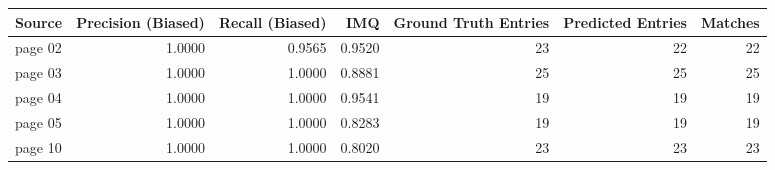 \begin{tabular}{lrrrrrr}
\toprule
Source & Precision (Biased) & Recall (Biased) & IMQ & Ground Truth Entries & Predicted Entries & Matches \\
\midrule
page 02 & 1.0000 & 0.9565 & 0.9520 & 23 & 22 & 22 \\
page 03 & 1.0000 & 1.0000 & 0.8881 & 25 & 25 & 25 \\
page 04 & 1.0000 & 1.0000 & 0.9541 & 19 & 19 & 19 \\
page 05 & 1.0000 & 1.0000 & 0.8283 & 19 & 19 & 19 \\
page 10 & 1.0000 & 1.0000 & 0.8020 & 23 & 23 & 23 \\
\bottomrule
\end{tabular}

